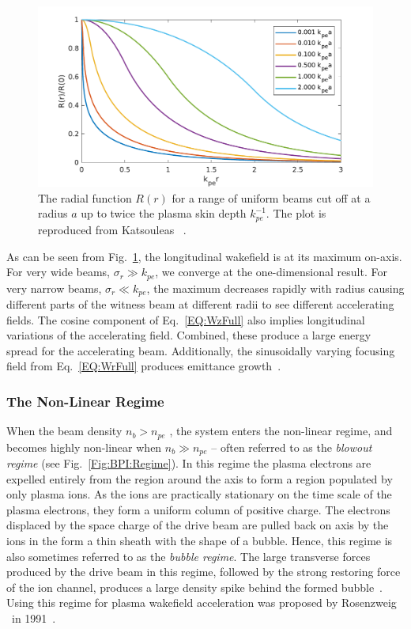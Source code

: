 \begin{figure}[hbt]
    \centering
    \includegraphics[width=0.8125\linewidth,trim={0mm 0mm 0mm 0mm},clip]{figures/RepKatsouleas1987}
    \caption{\label{Fig:BPI:Kat87} The radial function $R(r)$ for a range of uniform beams cut off at a radius $a$ up to twice the plasma skin depth $k_{pe}^{-1}$. The plot is reproduced from Katsouleas \etal~\cite{katsouleas:1987}.}
\end{figure}

As can be seen from Fig.~\ref{Fig:BPI:Kat87}, the longitudinal wakefield is at its maximum on-axis. For very wide beams, $\sigma_{r} \gg k_{pe}$, we converge at the one-dimensional result. For very narrow beams, $\sigma_{r} \ll k_{pe}$, the maximum decreases rapidly with radius causing different parts of the witness beam at different radii to see different accelerating fields. The cosine component of Eq.~\ref{EQ:WzFull} also implies longitudinal variations of the accelerating field. Combined, these produce a large energy spread for the accelerating beam. Additionally, the sinusoidally varying focusing field from Eq.~\ref{EQ:WrFull} produces emittance growth~\cite{muggli:2017,katsouleas:1987}.

\subsubsection{The Non-Linear Regime}
\label{Int:BPI:NLin}

When the beam density $n_{b} > n_{pe}$ , the system enters the non-linear regime, and becomes highly non-linear when $n_{b} \gg n_{pe}$ -- often referred to as the \textit{blowout regime} (see Fig.~\ref{Fig:BPI:Regime}). In this regime the plasma electrons are expelled entirely from the region around the axis to form a region populated by only plasma ions. As the ions are practically stationary on the time scale of the plasma electrons, they form a uniform column of positive charge. The electrons displaced by the space charge of the drive beam are pulled back on axis by the ions in the form a thin sheath with the shape of a bubble. Hence, this regime is also sometimes referred to as the \textit{bubble regime}. The large transverse forces produced by the drive beam in this regime, followed by the strong restoring force of the ion channel, produces a large density spike behind the formed bubble~\cite{dawson:1959,rosenzweig:1991}. Using this regime for plasma wakefield acceleration was proposed by Rosenzweig \etal ~in 1991~\cite{rosenzweig:1991}.

